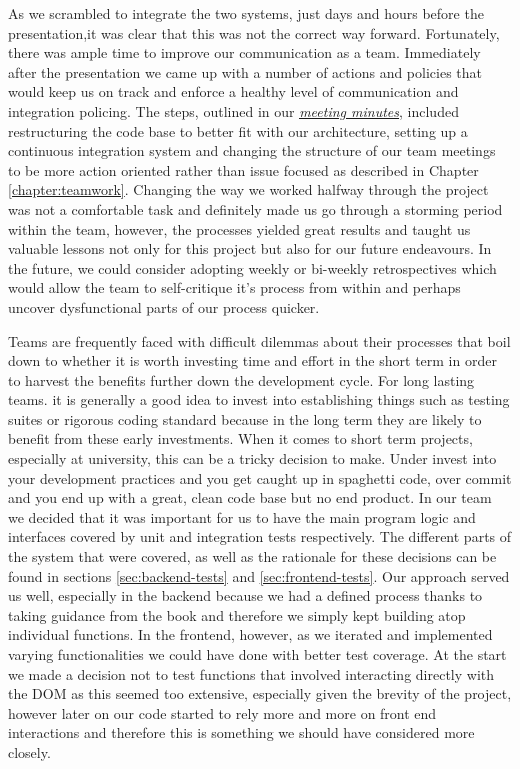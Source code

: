 \documentclass[a4paper]{report}
\begin{document}
	\par As we scrambled to integrate the two systems, just days and hours before the presentation,it was clear that this was not the correct way forward. Fortunately, there was ample time to improve our communication as a team. Immediately after the presentation we came up with a number of actions and policies that would keep us on track and enforce a healthy level of communication and integration policing. The steps, outlined in our \href{https://github.com/davidbenicek/raytracer/wiki/5th-Meeting-(14th-Feb-2018)}{\underline{\textit{meeting minutes}}}, included restructuring the code base to better fit with our architecture, setting up a continuous integration system and changing the structure of our team meetings to be more action oriented rather than issue focused as described in Chapter \ref{chapter:teamwork}. Changing the way we worked halfway through the project was not a comfortable task and definitely made us go through a storming period within the team, however, the processes yielded great results and taught us valuable lessons not only for this project but also for our future endeavours. In the future, we could consider adopting weekly or bi-weekly retrospectives which would allow the team to self-critique it's process from within and perhaps uncover dysfunctional parts of our process quicker. \newline
	
	\par Teams are frequently faced with difficult dilemmas about their processes that boil down to whether it is worth investing time and effort in the short term in order to harvest the benefits further down the development cycle. For long lasting teams. it is generally a good idea to invest into establishing things such as testing suites or rigorous coding standard because in the long term they are likely to benefit from these early investments. When it comes to short term projects, especially at university, this can be a tricky decision to make. Under invest into your development practices and you get caught up in spaghetti code, over commit and you end up with a great, clean code base but no end product. In our team we decided that it was important for us to have the main program logic and interfaces covered by unit and integration tests respectively. The different parts of the system that were covered, as well as the rationale for these decisions can be found in sections \ref{sec:backend-tests} and \ref{sec:frontend-tests}. Our approach served us well, especially in the backend because we had a defined process thanks to taking guidance from the book \cite{suffern_ray_2007} and therefore we simply kept building atop individual functions. In the frontend, however, as we iterated and implemented varying functionalities we could have done with better test coverage. At the start we made a decision not to test functions that involved interacting directly with the DOM as this seemed too extensive, especially given the brevity of the project, however later on our code started to rely more and more on front end interactions and therefore this is something we should have considered more closely. \newline
	
\end{document}
